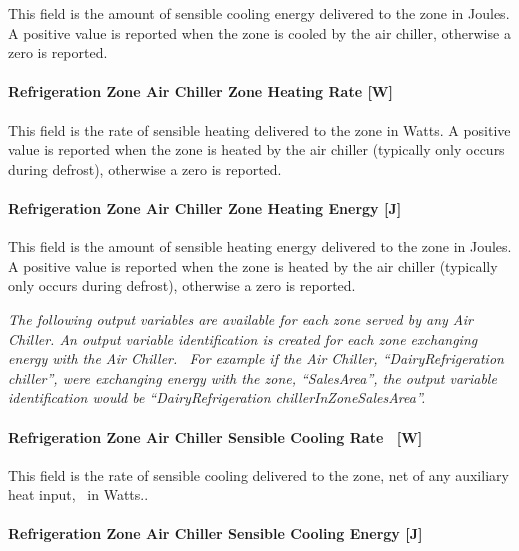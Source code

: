 This field is the amount of sensible cooling energy delivered to the zone in Joules. A positive value is reported when the zone is cooled by the air chiller, otherwise a zero is reported.

\paragraph{Refrigeration Zone Air Chiller Zone Heating Rate {[}W{]}}\label{refrigeration-zone-air-chiller-zone-heating-rate-w}

This field is the rate of sensible heating delivered to the zone in Watts. A positive value is reported when the zone is heated by the air chiller (typically only occurs during defrost), otherwise a zero is reported.

\paragraph{Refrigeration Zone Air Chiller Zone Heating Energy {[}J{]}}\label{refrigeration-zone-air-chiller-zone-heating-energy-j}

This field is the amount of sensible heating energy delivered to the zone in Joules. A positive value is reported when the zone is heated by the air chiller (typically only occurs during defrost), otherwise a zero is reported.

\emph{The following output variables are available for each zone served by any Air Chiller. An output variable identification is created for each zone exchanging energy with the Air Chiller.~ For example if the Air Chiller, ``DairyRefrigeration chiller'', were exchanging energy with the zone, ``SalesArea'', the output variable identification would be ``DairyRefrigeration chillerInZoneSalesArea''.}

\paragraph{Refrigeration Zone Air Chiller Sensible Cooling Rate~ {[}W{]}}\label{refrigeration-zone-air-chiller-sensible-cooling-rate-w-2}

This field is the rate of sensible cooling delivered to the zone, net of any auxiliary heat input,~ in Watts..

\paragraph{Refrigeration Zone Air Chiller Sensible Cooling Energy {[}J{]}}\label{refrigeration-zone-air-chiller-sensible-cooling-energy-j-1}

